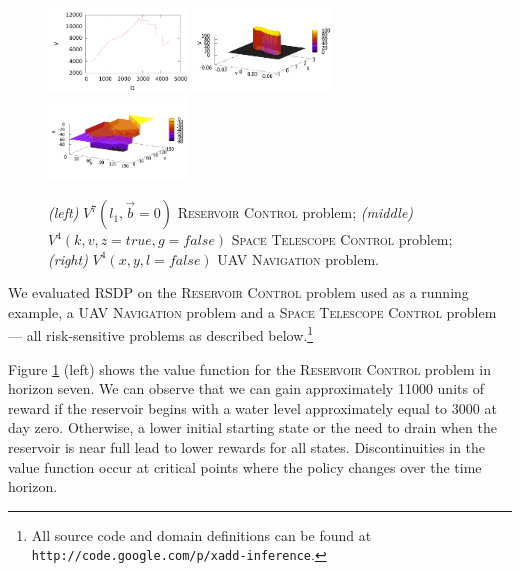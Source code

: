 \documentclass[letterpaper]{article}
\begin{document}
\begin{figure}[tbp!]
\centering
\includegraphics[width=0.33\textwidth]{Figures/reserV7New.pdf}
\includegraphics[width=0.33\textwidth]{Figures/telesV4.pdf}
\includegraphics[width=0.33\textwidth]{Figures/uavV4.pdf}
\vspace{-6mm}
\caption{\footnotesize
{\it (left)}  $V^7(l_1,\vec{b}=0)$ \textsc{Reservoir Control} problem;
{\it (middle)} $V^4(k,v,z=true,g=false)$ \textsc{Space Telescope Control} problem; 
{\it (right)}  $V^4(x,y,l=false)$ \textsc{UAV Navigation} problem.
}
\label{fig:Value}
\vspace{-5mm}
\end{figure}

\label{sec:results}

We evaluated RSDP on the \textsc{Reservoir Control} problem used as a running example,
a \textsc{UAV Navigation} problem  and
a \textsc{Space Telescope Control} problem --- all risk-sensitive
problems as described below.\footnote{All source code and domain definitions
can be found at \texttt{http://code.google.com/p/xadd-inference}.}

Figure \ref{fig:Value} (left) shows the value function for the
\textsc{Reservoir Control} problem in horizon seven. We can observe
that we can gain approximately 11000 units of reward if the reservoir
begins with a water level approximately equal to 3000 at day zero.
Otherwise, a lower initial starting state or the need to drain when
the reservoir is near full lead to lower rewards for all states.
Discontinuities in the value function occur at critical points where
the policy changes over the time horizon.
\end{document}
